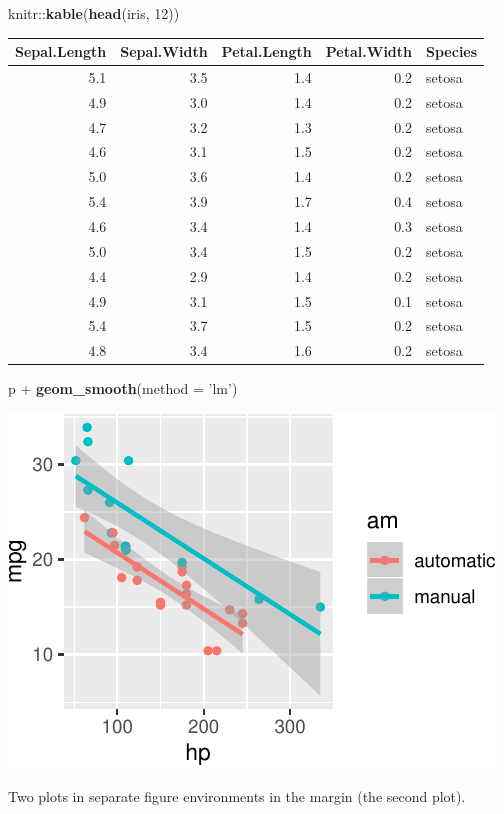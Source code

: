 \documentclass[]{tufte-handout}
\newenvironment{Shaded}{}{}
\newcommand{\KeywordTok}[1]{\textcolor[rgb]{0.00,0.44,0.13}{\textbf{#1}}}
\newcommand{\DataTypeTok}[1]{\textcolor[rgb]{0.56,0.13,0.00}{#1}}
\newcommand{\DecValTok}[1]{\textcolor[rgb]{0.25,0.63,0.44}{#1}}
\newcommand{\StringTok}[1]{\textcolor[rgb]{0.25,0.44,0.63}{#1}}
\newcommand{\OperatorTok}[1]{\textcolor[rgb]{0.40,0.40,0.40}{#1}}
\newcommand{\NormalTok}[1]{#1}
\begin{document}
\begin{Shaded}
\begin{Highlighting}[]
\NormalTok{knitr}\OperatorTok{::}\KeywordTok{kable}\NormalTok{(}\KeywordTok{head}\NormalTok{(iris, }\DecValTok{12}\NormalTok{))}
\end{Highlighting}
\end{Shaded}

\begin{longtable}[]{@{}rrrrl@{}}
\toprule
Sepal.Length & Sepal.Width & Petal.Length & Petal.Width &
Species\tabularnewline
\midrule
\endhead
5.1 & 3.5 & 1.4 & 0.2 & setosa\tabularnewline
4.9 & 3.0 & 1.4 & 0.2 & setosa\tabularnewline
4.7 & 3.2 & 1.3 & 0.2 & setosa\tabularnewline
4.6 & 3.1 & 1.5 & 0.2 & setosa\tabularnewline
5.0 & 3.6 & 1.4 & 0.2 & setosa\tabularnewline
5.4 & 3.9 & 1.7 & 0.4 & setosa\tabularnewline
4.6 & 3.4 & 1.4 & 0.3 & setosa\tabularnewline
5.0 & 3.4 & 1.5 & 0.2 & setosa\tabularnewline
4.4 & 2.9 & 1.4 & 0.2 & setosa\tabularnewline
4.9 & 3.1 & 1.5 & 0.1 & setosa\tabularnewline
5.4 & 3.7 & 1.5 & 0.2 & setosa\tabularnewline
4.8 & 3.4 & 1.6 & 0.2 & setosa\tabularnewline
\bottomrule
\end{longtable}

\begin{Shaded}
\begin{Highlighting}[]
\NormalTok{p }\OperatorTok{+}\StringTok{ }\KeywordTok{geom_smooth}\NormalTok{(}\DataTypeTok{method =} \StringTok{'lm'}\NormalTok{)}
\end{Highlighting}
\end{Shaded}

\begin{marginfigure}
\includegraphics{handout-twitter-analysis_files/figure-latex/fig-margin-separate-2} \caption[Two plots in separate figure environments in the margin (the second plot)]{Two plots in separate figure environments in the margin (the second plot).}\label{fig:fig-margin-separate2}
\end{marginfigure}
\end{document}
